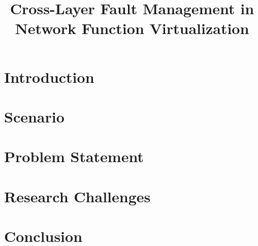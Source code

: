\documentclass[a4paper,twocolumn,conference]{IEEEtran}
\begin{document}

\title{Cross-Layer Fault Management in Network Function Virtualization}

\author{
}

\maketitle

\begin{abstract}
	
\end{abstract}

\IEEEpeerreviewmaketitle

\section{Introduction}
	

\section{Scenario}
	
%
\section{Problem Statement}
	

\section{Research Challenges}
	

\section{Conclusion}
	




\end{document}
